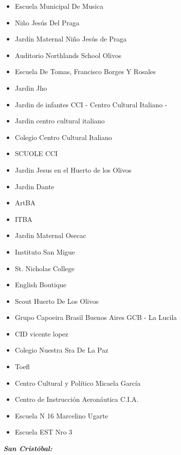\documentclass[a4paper, 10pt]{article}
\begin{document}
\begin{itemize}
\item Escuela Municipal De Musica
\item Niño Jesús Del Praga
\item Jardín Maternal Niño Jesús de Praga
\item Auditorio Northlands School Olivos
\item Escuela De Tomas, Francisco Borges Y Rosales
\item Jardin Jho
\item Jardin de infantes CCI - Centro Cultural Italiano -
\item Jardin centro cultural italiano
\item Colegio Centro Cultural Italiano
\item SCUOLE CCI
\item Jardin Jesus en el Huerto de los Olivos
\item Jardin Dante
\item ArtBA
\item ITBA
\item Jardin Maternal Osecac
\item Instituto San Migue
\item St. Nicholas College
\item English Boutique
\item Scout Huerto De Los Olivos
\item Grupo Capoeira Brasil Buenos Aires GCB - La Lucila
\item CID vicente lopez
\item Colegio Nuestra Sra De La Paz
\item Toefl
\item Centro Cultural y Político Micaela García
\item Centro de Instrucción Aeronáutica C.I.A.
\item Escuela N 16 Marcelino Ugarte
\item Escuela EST Nro 3
					\end{itemize}				
					\emph{\textbf{San Cristóbal:}}
\end{document}

